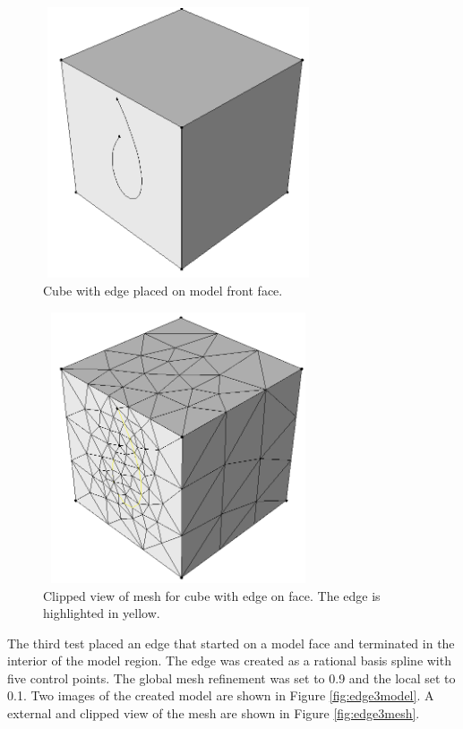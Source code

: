 \documentclass[a4paper, 12pt]{article}
\begin{document}
\begin{figure}[H]
  \centering
  \includegraphics[width=8cm, height=8cm]{test7_smd}
  \caption{Cube with edge placed on model front face.}
  \label{fig:edge2model}
\end{figure}

\begin{figure}[H]
  \centering
  \includegraphics[width=8cm, height=8cm]{test7_sms}
  \caption{Clipped view of mesh for cube with edge on face. 
          The edge is highlighted in yellow.}
  \label{fig:edge2mesh}
\end{figure}

The third test placed an edge that started on a model face and 
terminated in the interior of the model region. 
The edge was created as a rational basis spline with five control points.
The global mesh refinement was set to 0.9 and the local set to 0.1. 
Two images of the created model are shown in Figure \ref{fig:edge3model}.
A external and clipped view of the mesh are shown in Figure \ref{fig:edge3mesh}.
\end{document}
